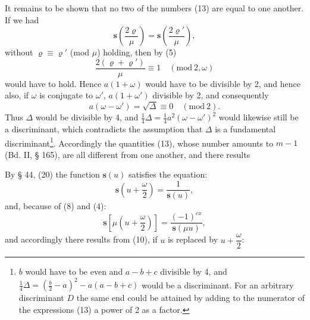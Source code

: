 It remains to be shown that no two of the numbers (13) are equal to
one another. If we had
\[
\boldsymbol{s}\left(\frac{2\varrho}{\mu}\right) = \boldsymbol{s}\left(\frac{2\varrho'}{\mu}\right),
\]
without $\varrho \equiv \varrho'$ (mod $\mu$) holding, then by (5)
\[
\frac{2(\varrho + \varrho')}{\mu} \equiv 1 \quad (\mathrm{mod}\ 2, \omega)
\]
would have to hold. Hence $a(1+\omega)$ would have to be divisible by 2,
and hence also, if $\omega$ is conjugate to $\omega'$, $a(1+\omega')$ divisible by 2,
and consequently
\[
a(\omega - \omega') = \sqrt{\Delta} \equiv 0 \quad (\mathrm{mod}\ 2).
\]
Thus $\Delta$ would be divisible by 4, and $\frac{1}{4}\Delta = \frac{1}{4}a^2(\omega - \omega')^2$
would likewise still be a discriminant, which contradicts the assumption
that $\Delta$ is a fundamental discriminant\footnote{$b$ would have to be even and $a-b+c$ divisible by 4, and
$\frac{1}{4}\Delta = \left(\frac{b}{2}-a\right)^2 - a(a-b+c)$ would be a discriminant. For an arbitrary
discriminant $D$ the same end could be attained by adding to the
numerator of the expressions (13) a power of 2 as a factor.}. Accordingly the
quantities (13), whose number amounts to $m-1$ (Bd. II, § 165), are all
different from one another, and there results

By § 44, (20) the function $\boldsymbol{s}(u)$ satisfies the equation:
\[
\boldsymbol{s}\left(u + \frac{\omega}{2}\right) = \frac{1}{\boldsymbol{s}(u)},
\]
and, because of (8) and (4):
\[
\boldsymbol{s}\left[\mu\left(u + \frac{\omega}{2}\right)\right] = \frac{(-1)^{cx}}{\boldsymbol{s}(\mu u)},
\]
and accordingly there results from (10), if $u$ is replaced by $u + \dfrac{\omega}{2}$:
